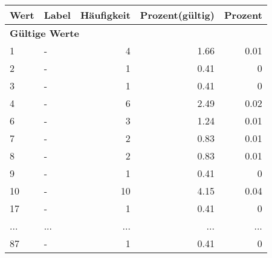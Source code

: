      \begin{longtable}{lXrrr}
     \toprule
     \textbf{Wert} & \textbf{Label} & \textbf{Häufigkeit} & \textbf{Prozent(gültig)} & \textbf{Prozent} \\
     \endhead
     \midrule
     \multicolumn{5}{l}{\textbf{Gültige Werte}}\\
        1 & \multicolumn{1}{X}{-} & %
          \num{4} &
          \num[round-mode=places,round-precision=2]{1.66} &
          \num[round-mode=places,round-precision=2]{0.01} \\
        2 & \multicolumn{1}{X}{-} & %
          \num{1} &
          \num[round-mode=places,round-precision=2]{0.41} &
          \num[round-mode=places,round-precision=2]{0} \\
        3 & \multicolumn{1}{X}{-} & %
          \num{1} &
          \num[round-mode=places,round-precision=2]{0.41} &
          \num[round-mode=places,round-precision=2]{0} \\
        4 & \multicolumn{1}{X}{-} & %
          \num{6} &
          \num[round-mode=places,round-precision=2]{2.49} &
          \num[round-mode=places,round-precision=2]{0.02} \\
        6 & \multicolumn{1}{X}{-} & %
          \num{3} &
          \num[round-mode=places,round-precision=2]{1.24} &
          \num[round-mode=places,round-precision=2]{0.01} \\
        7 & \multicolumn{1}{X}{-} & %
          \num{2} &
          \num[round-mode=places,round-precision=2]{0.83} &
          \num[round-mode=places,round-precision=2]{0.01} \\
        8 & \multicolumn{1}{X}{-} & %
          \num{2} &
          \num[round-mode=places,round-precision=2]{0.83} &
          \num[round-mode=places,round-precision=2]{0.01} \\
        9 & \multicolumn{1}{X}{-} & %
          \num{1} &
          \num[round-mode=places,round-precision=2]{0.41} &
          \num[round-mode=places,round-precision=2]{0} \\
        10 & \multicolumn{1}{X}{-} & %
          \num{10} &
          \num[round-mode=places,round-precision=2]{4.15} &
          \num[round-mode=places,round-precision=2]{0.04} \\
        17 & \multicolumn{1}{X}{-} & %
          \num{1} &
          \num[round-mode=places,round-precision=2]{0.41} &
          \num[round-mode=places,round-precision=2]{0} \\
       ... & ... & ... & ... & ... \\
        87 & \multicolumn{1}{X}{-} & %
          \num{1} &
          \num[round-mode=places,round-precision=2]{0.41} &
          \num[round-mode=places,round-precision=2]{0} \\


\end{longtable}
